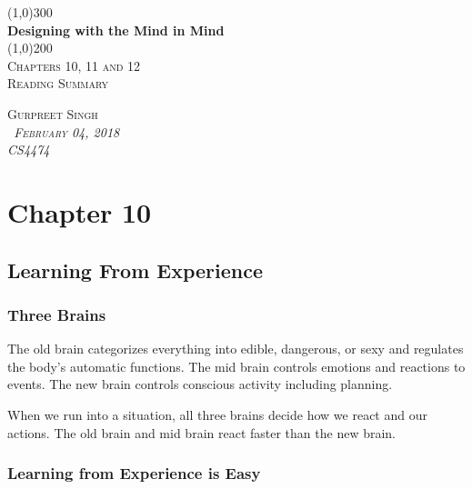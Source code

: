 \documentclass[11pt,]{article}
\begin{document}
\begin{titlepage}
    \begin{center}
    \line(1,0){300} \\ 
    [0.25in]
    \huge{\bfseries Designing with the Mind in Mind} \\
    [2mm]
    \line(1,0){200} \\
    [1.5cm] 
    \textsc{\Large Chapters 10, 11 and 12} \\
    [0.75cm]
    \textsc{\Large Reading Summary} \\
    [12cm]
    \end{center}
    
    \begin{flushright}
    \textsc{\Large{Gurpreet Singh \\}\normalsize\emph{\ February 04, 2018 \\}\normalsize\emph{CS4474 \\} }
    
    \end{flushright}

\end{titlepage}

\newpage
\shipout\null

\hypertarget{chapter-10}{%
\section{Chapter 10}\label{chapter-10}}

\hypertarget{learning-from-experience}{%
\subsection{Learning From Experience}\label{learning-from-experience}}

\hypertarget{three-brains}{%
\subsubsection{Three Brains}\label{three-brains}}

The old brain categorizes everything into edible, dangerous, or sexy and
regulates the body's automatic functions. The mid brain controls
emotions and reactions to events. The new brain controls conscious
activity including planning.

When we run into a situation, all three brains decide how we react and
our actions. The old brain and mid brain react faster than the new
brain.

\hypertarget{learning-from-experience-is-easy}{%
\subsubsection{Learning from Experience is
Easy}\label{learning-from-experience-is-easy}}
\end{document}
